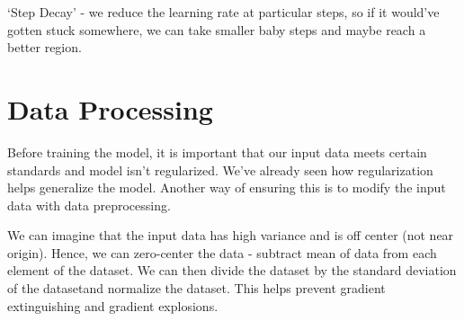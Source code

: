 ‘Step Decay’ - we reduce the learning rate at particular steps, so if it would’ve gotten stuck somewhere, we can take smaller baby steps and maybe reach a better region. 

\section{Data Processing}

Before training the model, it is important that our input data meets certain standards and model isn't regularized. We've already seen how regularization helps generalize the model. Another way of ensuring this is to modify the input data with data preprocessing.

We can imagine that the input data has high variance and is off center (not near origin). Hence, we can zero-center the data - subtract mean of data from each element of the dataset. We can then divide the dataset by the standard deviation of the datasetand normalize the dataset. This helps prevent gradient extinguishing and gradient explosions. 